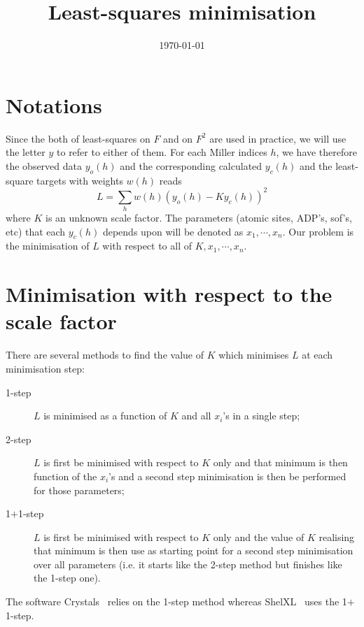 \documentclass[11pt]{article}
\title{Least-squares minimisation}
\author{\lucjbourhis}
\date{\today}
\begin{document}
\maketitle

\section{Notations}

Since the both of least-squares on $F$ and on $F^2$ are used in practice, we will use the letter $y$ to refer to either of them. For each Miller indices $h$, we have therefore the observed data $y_o(h)$ and the corresponding calculated $y_c(h)$ and the least-square targets with weights $w(h)$ reads
\begin{equation}
L = \sum_h w(h) (y_o(h) - K y_c(h))^2
\label{eqn:L:def}
\end{equation}
where $K$ is an unknown scale factor. The parameters (atomic sites, ADP's, sof's, etc) that each $y_c(h)$ depends upon will be denoted as $x_1, \cdots, x_n$. Our problem is the minimisation of $L$ with respect to all of $K, x_1, \cdots, x_n$.

\section{Minimisation with respect to the scale factor}

There are several methods to find the value of $K$ which minimises $L$ at each minimisation step:
\begin{description}
\item[1-step] $L$ is minimised as a function of $K$ and all $x_i$'s in a single step;
\label{eqn:onestepmini}
\item[2-step] $L$ is first be minimised with respect to $K$ only and that minimum is then function of the $x_i$'s and a second step minimisation is then be performed for those parameters;
\item[1$+$1-step] $L$ is first be minimised with respect to $K$ only and the value of $K$ realising that minimum is then use as starting point for a second step minimisation over all parameters (i.e. it starts like the 2-step method but finishes like the 1-step one).
\label{eqn:twostepmini}
\end{description}
The software Crystals~\cite{Crystals:v12} relies on the 1-step method whereas ShelXL~\cite{SHELX:man97} uses the 1$+$1-step.
\end{document}
